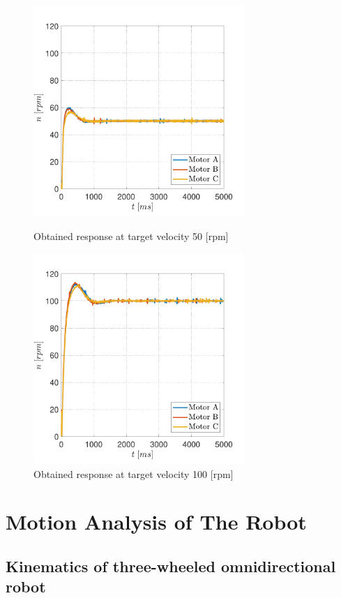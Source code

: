 \documentclass[12pt,english,twoside]{article}
\begin{document}
\begin{figure}[htb!]
	\centering
	\centering
	\includegraphics[height=8cm]{figures/controlled_50_p_02_i_002}
	\caption{Obtained response at target velocity 50 [rpm]}
	\label{obtained_response_50_good}
	\endminipage\hfill
	\centering
	\includegraphics[height=8cm]{figures/controlled_100_p_02_i_002}
	\caption{Obtained response at target velocity 100 [rpm]}
	\label{obtained_response_100_good}
	\endminipage\hfill
\end{figure}
\newpage

\newpage
\section{Motion Analysis of The Robot}
\subsection{Kinematics of three-wheeled omnidirectional robot}
\end{document}
